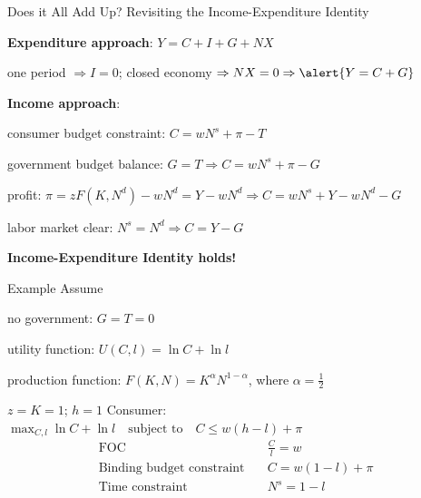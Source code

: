 \documentclass[11pt,aspectratio=169,usenames,dvipsnames]{beamer}
\let\tempone\itemize
\let\temptwo\enditemize
\renewenvironment{itemize}{\tempone\addtolength{\itemsep}{\fill}}{\temptwo}
\let\tempa\enumerate
\let\tempb\endenumerate
\renewenvironment{enumerate}{\tempa\addtolength{\itemsep}{\fill}}{\tempb}
\begin{document}
\begin{frame}{Does it All Add Up? Revisiting the Income-Expenditure Identity}
\label{slide:Does_it_All_Add_Up_}
\begin{itemize}
    \item \textbf{Expenditure approach}: $ Y = C + I + G + NX $
    \begin{itemize}
        \item one period $ \Rightarrow I = 0 $; closed economy $ \Rightarrow NX = 0 \Rightarrow  \alert{Y = C + G}$
    \end{itemize}
    \item \textbf{Income approach}:
    \begin{itemize}
        \item \alert{consumer budget constraint}: $ C = w N^{s} + \pi - T $
        \item \alert{government budget balance}: $ G = T \Rightarrow C = w N^{s} + \pi - G $
        \item \alert{profit}: $ \pi = z F( K, N^{d} ) - w N^{d} = Y - w N^{d} \Rightarrow C = w N^{s} + Y - wN^{d} - G $
        \item \alert{labor market clear}: $ N^{s} = N^{d} \Rightarrow C = Y - G$
    \end{itemize}
    \item \textbf{Income-Expenditure Identity holds!}
\end{itemize}
\end{frame}

\begin{frame}{Example}
\label{slide:Example}
    Assume
    \begin{enumerate}
        \item no government: $ G = T = 0 $
        \item utility function: $ U( C, l ) = \ln C + \ln l $
        \item production function: $ F( K, N ) = K^{\alpha}N^{1-\alpha} $, where $ \alpha = \frac{1}{2} $
        \item $ z = K = 1 $; $ h = 1 $
    \end{enumerate}
    Consumer: $ \max_{C, l} \ln C + \ln l \quad \text{subject to} \quad C \le w( h-l ) + \pi $
    \begin{align}
        \text{FOC} \quad
            & \frac{C}{l} = w
            \label{eq:consumerFOC}
        \\
        \text{Binding budget constraint} \quad
            & C = w ( 1-l ) + \pi
            \label{eq:binding_budget}
        \\
        \text{Time constraint} \quad
            & N^{s} = 1 - l
            \label{eq:time_budget}
    \end{align}
\end{frame}
\end{document}
